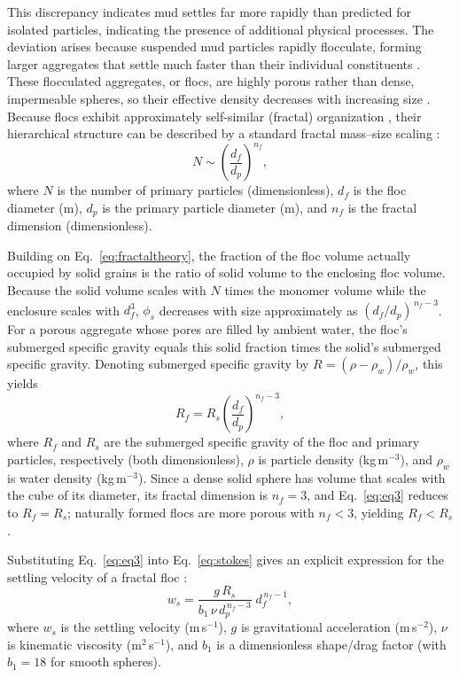 \documentclass{agujournal2019}
\begin{document}
This discrepancy indicates mud settles far more rapidly than predicted for isolated particles, indicating the presence of additional physical processes. The deviation arises because suspended mud particles rapidly flocculate, forming larger aggregates that settle much faster than their individual constituents \cite{droppo1997freshwater, johnson1996settling, kranenburg1994fractal}. These flocculated aggregates, or flocs, are highly porous rather than dense, impermeable spheres, so their effective density decreases with increasing size \cite{kranenburg1994fractal, Meakin1992Aggregation}. Because flocs exhibit approximately self-similar (fractal) organization \cite{family2012kinetics, jullien1987aggregation}, their hierarchical structure can be described by a standard fractal mass–size scaling \cite{Meakin1992Aggregation}:
\begin{equation}
N \sim \left( \frac{d_f}{d_p} \right)^{n_f},
    \label{eq:fractaltheory}
\end{equation}
where $N$ is the number of primary particles (dimensionless), $d_f$ is the floc diameter (m), $d_p$ is the primary particle diameter (m), and $n_f$ is the fractal dimension (dimensionless).

Building on Eq.~\eqref{eq:fractaltheory}, the fraction of the floc volume actually occupied by solid grains is the ratio of solid volume to the enclosing floc volume. Because the solid volume scales with $N$ times the monomer volume while the enclosure scales with $d_f^{3}$, $\phi_s$ decreases with size approximately as $(d_f/d_p)^{\,n_f-3}$. For a porous aggregate whose pores are filled by ambient water, the floc’s submerged specific gravity equals this solid fraction times the solid’s submerged specific gravity. Denoting submerged specific gravity by $R=(\rho-\rho_w)/\rho_w$, this yields
\begin{equation}
R_f = R_s \left( \frac{d_f}{d_p} \right)^{n_f - 3},
    \label{eq:eq3}
\end{equation}
where $R_f$ and $R_s$ are the submerged specific gravity of the floc and primary particles, respectively (both dimensionless), $\rho$ is particle density (kg\,m$^{-3}$), and $\rho_w$ is water density (kg\,m$^{-3}$). Since a dense solid sphere has volume that scales with the cube of its diameter, its fractal dimension is $n_f=3$, and Eq.~\eqref{eq:eq3} reduces to $R_f=R_s$; naturally formed flocs are more porous with $n_f<3$, yielding $R_f<R_s$.

Substituting Eq.~\eqref{eq:eq3} into Eq.~\eqref{eq:stokes} gives an explicit expression for the settling velocity of a fractal floc \cite{strom2011explicit, winterwerp1998simple}:
\begin{equation}
    w_s = \frac{g\,R_s}{b_1\,\nu\,d_p^{\,n_f - 3}}\; d_f^{\,n_f - 1},
    \label{eq:floc_settling}
\end{equation}
where $w_s$ is the settling velocity (m\,s$^{-1}$), $g$ is gravitational acceleration (m\,s$^{-2}$), $\nu$ is kinematic viscosity (m$^{2}$\,s$^{-1}$), and $b_1$ is a dimensionless shape/drag factor (with $b_1=18$ for smooth spheres).
\end{document}
